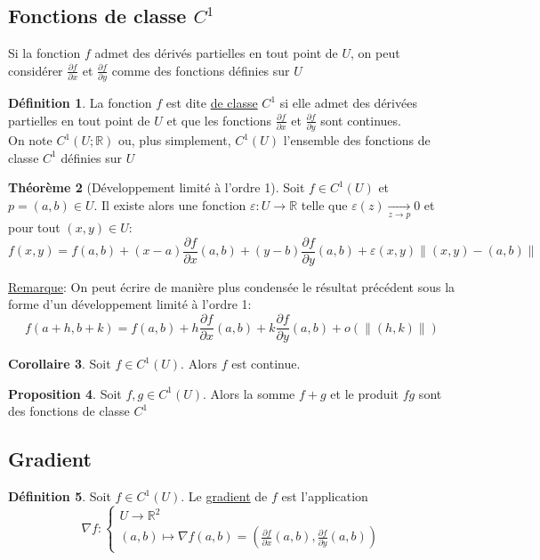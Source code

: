\documentclass[10pt,a4paper]{article}
\theoremstyle{definition}
\newtheorem{proposition}{Proposition}[section]
\newtheorem{theorem}[proposition]{Théorème}
\newtheorem{corollaire}[proposition]{Corollaire}
\newtheorem{definition}[proposition]{Définition}
\begin{document}
\subsection{Fonctions de classe $C^1$}
Si la fonction $f$ admet des dérivés partielles en tout point de $U$, on peut considérer $\frac{\partial f}{\partial x}$ et $\frac{\partial f}{\partial y}$ comme des fonctions définies sur $U$
\begin{definition}
La fonction $f$ est dite \uline{de classe} $C^1$ si elle admet des dérivées partielles en tout point de $U$ et que les fonctions $\frac{\partial f}{\partial x}$ et $\frac{\partial f}{\partial y}$ sont continues. \\
On note $C^1(U; \mathbb{R})$ ou, plus simplement, $C^1(U)$ l'ensemble des fonctions de classe $C^1$ définies sur $U$
\end{definition}
\begin{theorem}[Développement limité à l'ordre 1]
Soit $f \in C^1(U)$ et $p = (a, b) \in U$. Il existe alors une fonction $\varepsilon: U \to \mathbb{R}$ telle que $\varepsilon(z) \xrightarrow[z \to p]{} 0$ et pour tout $(x, y) \in U$:
\[ f(x, y) = f(a, b) + (x - a) \frac{\partial f}{\partial x}(a, b) + (y - b) \frac{\partial f}{\partial y}(a, b) + \varepsilon(x, y) \left\| (x, y) - (a, b) \right\| \]
\end{theorem}

\noindent \uline{Remarque}: On peut écrire de manière plus condensée le résultat précédent sous la forme d'un développement limité à l'ordre 1:
\[ f(a + h, b + k) = f(a, b) + h \frac{\partial f}{\partial x} (a, b) + k \frac{\partial f}{\partial y} (a, b) + o \left( \| (h, k) \| \right) \]
\begin{corollaire}
Soit $f \in C^1(U)$. Alors $f$ est continue.
\end{corollaire}
\begin{proposition}
Soit $f, g \in C^1(U)$. Alors la somme $f + g$ et le produit $f g$ sont des fonctions de classe $C^1$
\end{proposition}

\subsection{Gradient}
\begin{definition}
Soit $f \in C^1(U)$. Le \uline{gradient} de $f$ est l'application
\[ \nabla f: \begin{cases}
U \to \mathbb{R}^2 \\
(a, b) \mapsto \nabla f(a, b) = \left( \frac{\partial f}{\partial x}(a, b), \frac{\partial f}{\partial y}(a, b) \right) \end{cases} \]
\end{definition}
\end{document}
